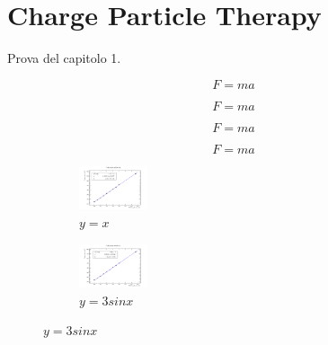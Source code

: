 \chapter{Charge Particle Therapy}


Prova del capitolo 1.

\begin{equation}
    F = ma
\end{equation}


\begin{equation}
    F = ma
\end{equation}


\begin{equation}
    F = ma
\end{equation}


\begin{equation}
    F = ma
\end{equation}



\begin{figure}
    \centering
    \begin{subfigure}[b]{0.15\textwidth}
        \centering
        \includegraphics[width=2cm]{figures/ch0.pdf}
        \caption{$y=x$}
        \label{fig:y equals x}
    \end{subfigure}
    \hfill
    \begin{subfigure}[b]{0.15\textwidth}
        \centering
        \includegraphics[width=2cm]{figures/ch1.pdf}
        \caption{$y=3sinx$}
        \label{fig:three sin x}
    \end{subfigure}
\end{figure}








